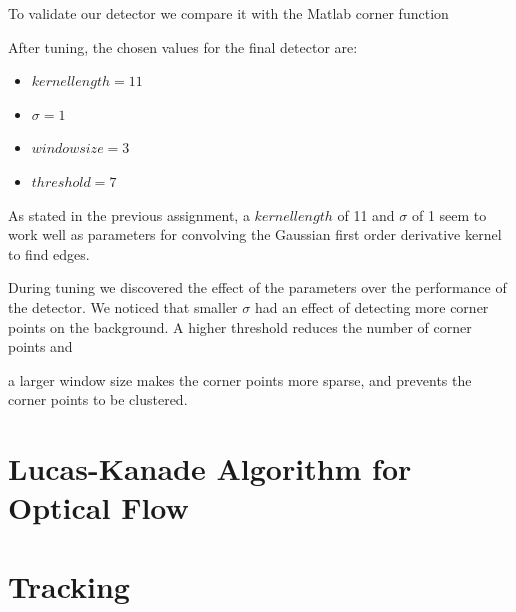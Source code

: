 \documentclass[11pt]{article}
\begin{document}
To validate our detector we compare it with the Matlab corner function




After tuning, the chosen values for the final detector are:
\begin{itemize}
	\item $kernel  length = 11$
	\item $\sigma = 1$
	\item $window  size = 3$
	\item $threshold = 7$
\end{itemize}

As stated in the previous assignment, a $kernel length$ of 11 and $\sigma$ of 1
seem to work well as parameters for convolving the Gaussian first order
derivative kernel to find edges. 

During tuning we discovered the effect of the parameters over the performance of
the detector. We noticed that smaller $\sigma$ had an effect of detecting more
corner points on the background. A higher threshold reduces the number of corner
points and 

a larger window size makes the corner points more sparse, and prevents the
corner points to be clustered. 

\section{Lucas-Kanade Algorithm for Optical Flow}



\section{Tracking}
\end{document}
